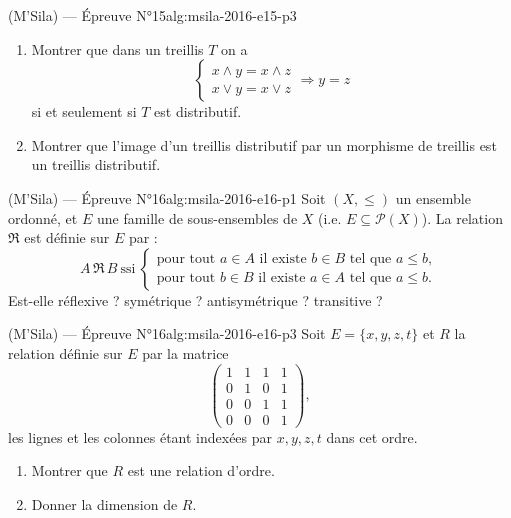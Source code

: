 \begin{problem}{(M'Sila) — Épreuve N°15}{alg:msila-2016-e15-p3}
\begin{enumerate}
\item Montrer que dans un treillis $T$ on a
      $$
      \begin{cases} x \wedge y = x \wedge z \\ x \vee y = x \vee z \end{cases}
      \Longrightarrow y = z
      $$
      si et seulement si $T$ est distributif.
\item Montrer que l'image d'un treillis distributif par un morphisme de treillis est
      un treillis distributif.
\end{enumerate}

\end{problem}

\newpage

\begin{problem}{(M'Sila) — Épreuve N°16}{alg:msila-2016-e16-p1}
Soit $(X, \le)$ un ensemble ordonné, et $E$ une famille de sous-ensembles de $X$
(i.e. $E \subseteq \mathcal{P}(X)$). La relation $\mathfrak{R}$ est définie sur $E$
par :
$$
A\,\mathfrak{R}\,B \ \text{ssi} \
\begin{cases}
\text{pour tout } a \in A \text{ il existe } b \in B \text{ tel que } a \le b, \\
\text{pour tout } b \in B \text{ il existe } a \in A \text{ tel que } a \le b.
\end{cases}
$$
Est-elle réflexive ? symétrique ? antisymétrique ? transitive ?

\end{problem}

\newpage

\begin{problem}{(M'Sila) — Épreuve N°16}{alg:msila-2016-e16-p3}
Soit $E = \{x, y, z, t\}$ et $R$ la relation définie sur $E$ par la matrice
$$
\begin{pmatrix}1&1&1&1\\0&1&0&1\\0&0&1&1\\0&0&0&1\end{pmatrix},
$$
les lignes et les colonnes étant indexées par $x, y, z, t$ dans cet ordre.
\begin{enumerate}
\item Montrer que $R$ est une relation d'ordre.
\item Donner la dimension de $R$.
\end{enumerate}

\end{problem}

